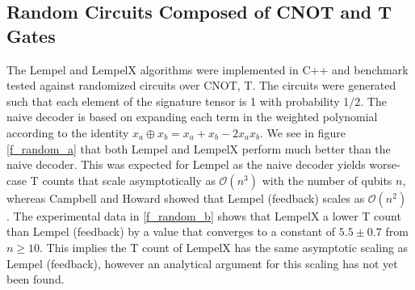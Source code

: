 \documentclass{article}
\theoremstyle{definition}
\theoremstyle{problem}
\theoremstyle{lemma}
\begin{document}
				\subsection{Random Circuits Composed of CNOT and T Gates}
				The Lempel and LempelX algorithms were implemented in C++ and benchmark tested against randomized circuits over CNOT, T. The circuits were generated such that each element of the signature tensor is 1 with probability 1/2. The naive decoder is based on expanding each term in the weighted polynomial according to the identity $x_a \oplus x_b = x_a + x_b - 2x_a x_b$. We see in figure \ref{f_random_a} that both Lempel and LempelX perform much better than the naive decoder. This was expected for Lempel as the naive decoder yields worse-case T counts that scale asymptotically as $\mathcal{O}(n^3)$ with the number of qubits $n$, whereas Campbell and Howard showed that Lempel (feedback) scales as $\mathcal{O}(n^2)$ \cite{1_Campbell_2017}. The experimental data in \ref{f_random_b} shows that LempelX a lower T count than Lempel (feedback) by a value that converges to a constant of $5.5\pm 0.7$ from $n\geq 10$. This implies the T count of LempelX has the same asymptotic scaling as Lempel (feedback), however an analytical argument for this scaling has not yet been found.
				
\end{document}
